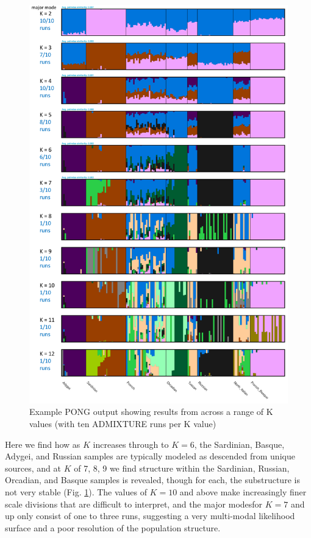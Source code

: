 \documentclass{svmult}       %
\begin{document}
\begin{figure}
\includegraphics[width=1\linewidth]{Figures/Figure5}
 \caption{\label{fig:Fig5}
     Example PONG output showing results from across a range of K values (with ten ADMIXTURE runs per K value)}
\end{figure}

Here we find how as \(K\) increases through to \(K=6\), the Sardinian,
Basque, Adygei, and Russian samples are typically modeled as descended
from unique sources, and at \(K\) of 7, 8, 9 we find structure within
the Sardinian, Russian, Orcadian, and Basque samples is revealed, though
for each, the substructure is not very stable (Fig. \ref{fig:Fig5}). The values of \(K=10\)
and above make increasingly finer scale divisions that are difficult to
interpret, and the major modesfor \(K=7\) and up only consist of one to
three runs, suggesting a very multi-modal likelihood surface and a poor
resolution of the population structure.
\end{document}
